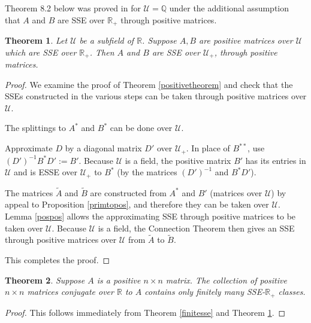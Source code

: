 \documentclass{amsart}
\newtheorem{theorem}{Theorem}[section]
\theoremstyle{definition}
\theoremstyle{remark}
\numberwithin{equation}{section}
\begin{document}
{{%
Theorem 8.2 below was proved in \cite{KR5} for $\mathcal U=\mathbb Q$ 
under the additional assumption that 
$A$ and $B$ are SSE over $ \mathbb R_+$ through positive matrices. 


\begin{theorem} \label{field}
Let $\mathcal U$ be a subfield of $\mathbb R$.
Suppose $A,B$ are positive matrices over $\mathcal U$ 
which  are SSE over $\mathbb R_+$. Then 
$A$ and $B$ are SSE over $ \mathcal U_+$, through positive matrices. 
\end{theorem} 

\begin{proof} 
We examine the proof of Theorem \ref{positivetheorem} 
and check that the SSEs constructed in the various steps 
can be taken through positive matrices over $\mathcal U$.

The splittings to $A^*$ and  $B^*$ can be done over  $\mathcal U$.

Approximate $D$ by a diagonal matrix $D'$ over  $\mathcal U_+$.
In place of $B^{**}$, use $(D')^{-1}B^*D':=B'$. 
Because $\mathcal U$ is a field, the positive matrix $B'$ 
has its  entries  in
$\mathcal U$ and is ESSE over $\mathcal U_+$ 
to 
$B^*$ (by the matrices 
$(D')^{-1}$ and $B^*D'$). 

The matrices 
$\widetilde A$ 
and  $\widetilde B$ are constructed 
from $A^*$ and $B'$ (matrices over 
$\mathcal U$) by appeal to 
Proposition \ref{primtopos}, and therefore they can be 
taken over  $\mathcal U$. Lemma \ref{pospos} allows the 
approximating SSE through positive matrices to be taken over $\mathcal U$.
 Because $\mathcal U$ is a field, the 
Connection Theorem then 
gives an SSE through positive matrices over $\mathcal U$ 
from 
$\widetilde A$ 
to  $\widetilde B$.

This completes the proof.
\end{proof} 


\begin{theorem}\label{finitessefield}  Suppose $A$ is a positive $n\times n$ 
matrix. The collection of positive $n\times n$ matrices 
conjugate over $\mathbb R$ to $A$ contains  only finitely many 
SSE-$\mathbb R_+$ classes. 
\end{theorem} 
\begin{proof}
This follows immediately from Theorem \ref{finitesse} and Theorem \ref{field}.
\end{proof}

}}
\end{document}
